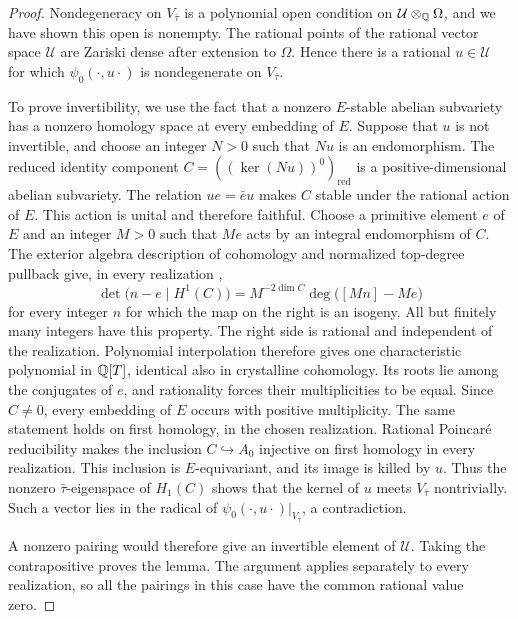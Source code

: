 \begin{proof}
Nondegeneracy on $V_{\bar\tau}$ is a polynomial open condition on
$\mathcal U\otimes_\mathbb Q\Omega$, and we have shown this open is
nonempty.  The rational points of the rational vector space
$\mathcal U$ are Zariski dense after extension to $\Omega$.  Hence
there is a rational $u\in\mathcal U$ for which
$\psi_0(\cdot,u\cdot)$ is nondegenerate on $V_{\bar\tau}$.

To prove invertibility, we use the fact that a nonzero $E$-stable
abelian subvariety has a nonzero homology space at every embedding
of $E$.  Suppose that $u$ is not invertible, and choose an integer
$N>0$ such that $Nu$ is an endomorphism.  The reduced identity
component $C=((\ker(Nu))^0)_{\mathrm{red}}$ is a
positive-dimensional abelian subvariety.  The relation $ue=\bar e u$ makes $C$ stable under
the rational action of $E$.  This action is unital and therefore
faithful.  Choose a primitive element $e$ of $E$ and an integer
$M>0$ such that $Me$ acts by an integral endomorphism of $C$.
The exterior algebra description of cohomology and normalized
top-degree pullback give, in every realization
\cite[Appendix, Proposition~(A.2)(a),(b)]{Milne1999},
\[
 \det\bigl(n-e\mid H^1(C)\bigr)
    =M^{-2\dim C}\deg\bigl([Mn]-Me\bigr)
\]
for every integer $n$ for which the map on the right is an
isogeny.  All but finitely many integers have this property.
The right side is rational and independent of the realization.
Polynomial interpolation therefore gives one characteristic
polynomial in $\mathbb Q[T]$, identical also in crystalline cohomology.
Its roots lie among
the conjugates of $e$, and rationality forces their multiplicities to
be equal.  Since $C\ne0$, every embedding of $E$ occurs with positive
multiplicity.  The same statement holds on first homology, in the
chosen realization. Rational Poincar\'e reducibility
\cite[Proposition~12.1]{MilneAV} makes the inclusion
\(C\hookrightarrow A_0\) injective on first homology in every
realization. This inclusion is \(E\)-equivariant, and its
image is killed by \(u\). Thus the nonzero \(\bar\tau\)-eigenspace
of \(H_1(C)\) shows that the kernel of \(u\) meets
\(V_{\bar\tau}\) nontrivially.  Such a vector lies in the radical of
$\psi_0(\cdot,u\cdot)|_{V_{\bar\tau}}$, a contradiction.

A nonzero pairing would therefore give an invertible element of
$\mathcal U$.  Taking the contrapositive proves the lemma.  The
argument applies separately to every realization, so all the
pairings in this case have the common rational value zero.
\end{proof}

